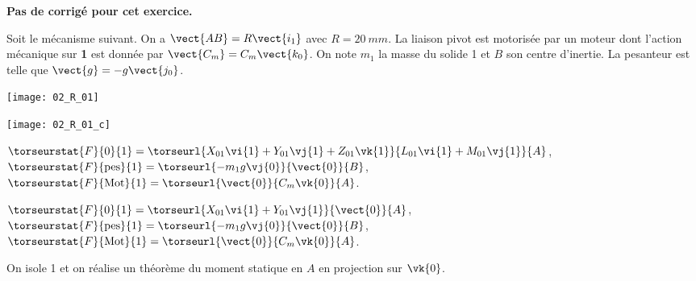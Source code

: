 \normaltrue
\correctiontrue


\setcounter{question}{0}
\ifcorrection
\else
\textbf{Pas de corrigé pour cet exercice.}
\fi

\ifprof
\else
Soit le mécanisme suivant. On a $\vect{AB}=R\vect{i_1}$ avec $R=\SI{20}{mm}$. La liaison pivot est motorisée par un moteur dont l'action mécanique sur \textbf{1} est donnée par $\vect{C_m}=C_m \vect{k_0}$.
On note $m_1$ la masse du solide 1 et $B$ son centre d'inertie. 
 La pesanteur est telle que $\vect{g}=-g\vect{j_0}$.

\begin{center}
\texttt{[image: 02\_R\_01]}
\end{center}
\fi

\ifprof
\begin{center}
\texttt{[image: 02\_R\_01\_c]}
\end{center}
\else
\fi

\ifprof
$\torseurstat{F}{0}{1}=\torseurl{X_{01}\vi{1}+Y_{01}\vj{1}+Z_{01}\vk{1}}{L_{01}\vi{1}+M_{01}\vj{1}}{A}$,
$\torseurstat{F}{\text{pes}}{1}=\torseurl{-m_1g\vj{0}}{\vect{0}}{B}$, 
$\torseurstat{F}{\text{Mot}}{1}=\torseurl{\vect{0}}{C_m\vk{0}}{A}$.
\else
\fi


\ifprof
$\torseurstat{F}{0}{1}=\torseurl{X_{01}\vi{1}+Y_{01}\vj{1}}{\vect{0}}{A}$,
$\torseurstat{F}{\text{pes}}{1}=\torseurl{-m_1g\vj{0}}{\vect{0}}{B}$,
$\torseurstat{F}{\text{Mot}}{1}=\torseurl{\vect{0}}{C_m\vk{0}}{A}$.
\else
\fi

\ifprof
On isole 1 et on réalise un théorème du moment statique en $A$ en projection sur $\vk{0}$.
\else
\fi



